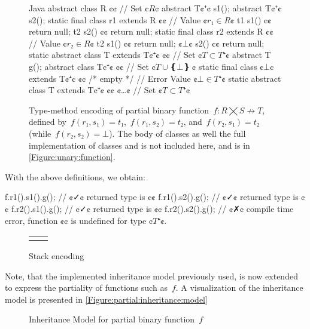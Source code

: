 \begin{figure}[hbt]
  \begin{Code}{Java}
abstract class R {¢¢ // Set ¢$R$¢
  abstract T¢$⁺$¢ s1();
  abstract T¢$⁺$¢ s2();
  static final class r1 extends R {¢¢ // Value ¢$r₁∈R$¢
    t1 s1() {¢¢ return null; }
    t2 s2() {¢¢ return null; }
  }
  static final class r2 extends R {¢¢ // Value ¢$r₂∈R$¢
    t2 s1() {¢¢ return null; }
    ¢$⊥$¢ s2() {¢¢ return null; }
  }
  static abstract class T extends T¢$⁺$¢ {¢¢ // Set ¢$T⊂T⁺$¢
    abstract T g();
  }
  abstract class T¢$⁺$¢ {¢¢ // Set ¢$T∪❴⊥❵~$¢
    static final class ¢$⊥$¢ extends T¢$⁺$¢ {¢¢ /* empty */ } // Error Value ¢$⊥∈T⁺$¢
    static abstract class T extends T¢$⁺$¢ {¢¢ ¢…¢ } // Set ¢$T⊂T⁺$¢
  }
}
\end{Code}
  \caption{Type-method encoding of partial binary function~$f: R⨉S↛T$,
  defined by~$f(r₁,s₁)=t₁$,~$f(r₁,s₂)=t₂$, and~$f(r₂,s₁)=t₂$ (while~$f(r₂, s₂) =⊥$).
  The body of classes  as well the full implementation of classes  and  is not included here, and is
    in \cref{Figure:unary:function}.}
  \label{Figure:simple:binary}
\end{figure}

With the above definitions, we obtain:
\begin{JAVA}
f.r1().s1().g(); // ¢✓¢ returned type is ¢¢
f.r1().s2().g(); // ¢✓¢ returned type is ¢¢
f.r2().s1().g(); // ¢✓¢ returned type is ¢¢
f.r2().s2().g(); // ¢✗¢ compile time error, function ¢¢ is undefined for type ¢$T⁺$¢.
\end{JAVA}

\begin{figure}[h]
  \begin{tabular}{c|l}
     
    \caption{Stack encoding}
    \label{Figure:stack:encoding}
  &
    \begin{adjustbox}{max width=0.2\linewidth}
      
    \end{adjustbox}
  \end{tabular}
\end{figure}
Note, that the implemented inheritance model previously used, is now extended to express the partiality
  of functions such as~$f$. A visualization of the inheritance model is presented in \cref{Figure:partial:inheritance:model}

\begin{figure}[ht]
  \label{Figure:partial:inheritence:model}
  \caption{Inheritance Model for partial binary function~$f$}
  \begin{adjustbox}{max width=0.6\linewidth}
    
  \end{adjustbox}
\end{figure}

